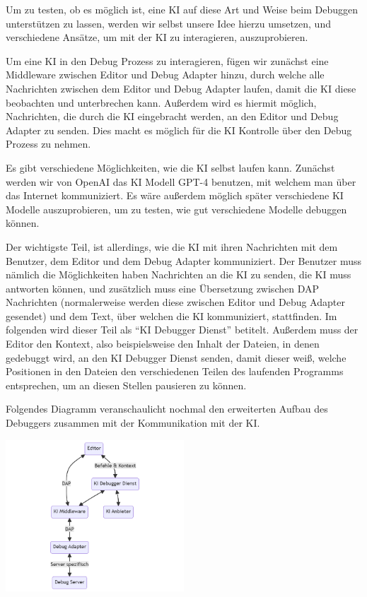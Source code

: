 \documentclass[a4paper,12pt,ngerman]{scrartcl}
\begin{document}
Um zu testen, ob es möglich ist, eine KI auf diese Art und Weise beim Debuggen unterstützen zu lassen, werden wir selbst unsere Idee hierzu umsetzen, und verschiedene Ansätze, um mit der KI zu interagieren, auszuprobieren.

Um eine KI in den Debug Prozess zu interagieren, fügen wir zunächst eine Middleware zwischen Editor und Debug Adapter hinzu, durch welche alle Nachrichten zwischen dem Editor und Debug Adapter laufen, damit die KI diese beobachten und unterbrechen kann. Außerdem wird es hiermit möglich, Nachrichten, die durch die KI eingebracht werden, an den Editor und Debug Adapter zu senden. Dies macht es möglich für die KI Kontrolle über den Debug Prozess zu nehmen.

Es gibt verschiedene Möglichkeiten, wie die KI selbst laufen kann. Zunächst werden wir von OpenAI das KI Modell GPT-4 benutzen, mit welchem man über das Internet kommuniziert. Es wäre außerdem möglich später verschiedene KI Modelle auszuprobieren, um zu testen, wie gut verschiedene Modelle debuggen können.

Der wichtigste Teil, ist allerdings, wie die KI mit ihren Nachrichten mit dem Benutzer, dem Editor und dem Debug Adapter kommuniziert. Der Benutzer muss nämlich die Möglichkeiten haben Nachrichten an die KI zu senden, die KI muss antworten können, und zusätzlich muss eine Übersetzung zwischen DAP Nachrichten (normalerweise werden diese zwischen Editor und Debug Adapter gesendet) und dem Text, über welchen die KI kommuniziert, stattfinden. Im folgenden wird dieser Teil als ``KI Debugger Dienst'' betitelt. Außerdem muss der Editor den Kontext, also beispielsweise den Inhalt der Dateien, in denen gedebuggt wird, an den KI Debugger Dienst senden, damit dieser weiß, welche Positionen in den Dateien den verschiedenen Teilen des laufenden Programms entsprechen, um an diesen Stellen pausieren zu können.

Folgendes Diagramm veranschaulicht nochmal den erweiterten Aufbau des Debuggers zusammen mit der Kommunikation mit der KI.

\begin{center}	
	\includegraphics[width=0.5\textwidth]{ai_integration}
\end{center}
\end{document}

